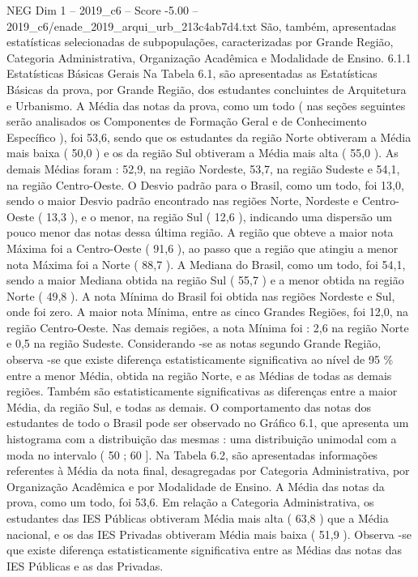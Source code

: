 \begin{textsample}{NEG Dim 1 – 2019\_c6 – Score -5.00 – 2019\_c6/enade\_2019\_arqui\_urb\_213c4ab7d4.txt}
São, também, apresentadas estatísticas selecionadas de subpopulações, caracterizadas por Grande Região, Categoria Administrativa, Organização Acadêmica e Modalidade de Ensino. 6.1.1 Estatísticas Básicas Gerais Na Tabela 6.1, são apresentadas as Estatísticas Básicas da prova, por Grande Região, dos estudantes concluintes de Arquitetura e Urbanismo.
A Média das notas da prova, como um todo ( nas seções seguintes serão analisados os Componentes de Formação Geral e de Conhecimento Específico ), foi 53,6, sendo que os estudantes da região Norte obtiveram a Média mais baixa ( 50,0 ) e os da região Sul obtiveram a Média mais alta ( 55,0 ).
As demais Médias foram : 52,9, na região Nordeste, 53,7, na região Sudeste e 54,1, na região Centro-Oeste.
O Desvio padrão para o Brasil, como um todo, foi 13,0, sendo o maior Desvio padrão encontrado nas regiões Norte, Nordeste e Centro-Oeste ( 13,3 ), e o menor, na região Sul ( 12,6 ), indicando uma dispersão um pouco menor das notas dessa última região.
A região que obteve a maior nota Máxima foi a Centro-Oeste ( 91,6 ), ao passo que a região que atingiu a menor nota Máxima foi a Norte ( 88,7 ).
A Mediana do Brasil, como um todo, foi 54,1, sendo a maior Mediana obtida na região Sul ( 55,7 ) e a menor obtida na região Norte ( 49,8 ).
A nota Mínima do Brasil foi obtida nas regiões Nordeste e Sul, onde foi zero.
A maior nota Mínima, entre as cinco Grandes Regiões, foi 12,0, na região Centro-Oeste.
Nas demais regiões, a nota Mínima foi : 2,6 na região Norte e 0,5 na região Sudeste.
Considerando -se as notas segundo Grande Região, observa -se que existe diferença estatisticamente significativa ao nível de 95 \% entre a menor Média, obtida na região Norte, e as Médias de todas as demais regiões.
Também são estatisticamente significativas as diferenças entre a maior Média, da região Sul, e todas as demais.
O comportamento das notas dos estudantes de todo o Brasil pode ser observado no Gráfico 6.1, que apresenta um histograma com a distribuição das mesmas : uma distribuição unimodal com a moda no intervalo ( 50 ; 60 ].
Na Tabela 6.2, são apresentadas informações referentes à Média da nota final, desagregadas por Categoria Administrativa, por Organização Acadêmica e por Modalidade de Ensino.
A Média das notas da prova, como um todo, foi 53,6.
Em relação a Categoria Administrativa, os estudantes das IES Públicas obtiveram Média mais alta ( 63,8 ) que a Média nacional, e os das IES Privadas obtiveram Média mais baixa ( 51,9 ).
Observa -se que existe diferença estatisticamente significativa entre as Médias das notas das IES Públicas e as das Privadas.

\end{textsample}
